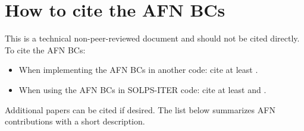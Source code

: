 \chapter{How to cite the AFN BCs}

This is a technical non-peer-reviewed document and should not be cited directly. To cite the AFN BCs:

\begin{itemize}
    \item When implementing the AFN BCs in another code: cite at least \cite{nf_niels}.
    \item When using the AFN BCs in SOLPS-ITER code: cite at least \cite{nf_niels} and \cite{nf_wim}.
\end{itemize}

Additional papers can be cited if desired. The list below summarizes AFN contributions with a short description.

